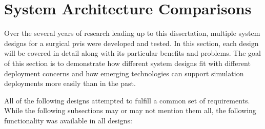 \section{System Architecture Comparisons}

Over the several years of research leading up to this dissertation,
multiple system designs for a surgical \gls{pvis} were developed and
tested. In this section, each design will be covered in detail along
with its particular benefits and problems. The goal of this section is
to demonstrate how different system designs fit with different
deployment concerns and how emerging technologies can support
simulation deployments more easily than in the past.

All of the following designs attempted to fulfill a common set of
requirements. While the following subsections may or may not mention
them all, the following functionality was available in all designs:

